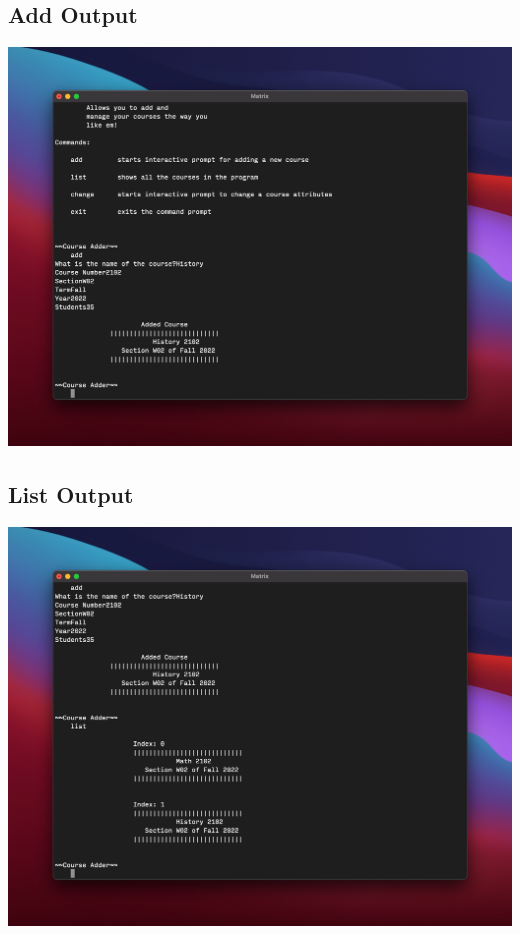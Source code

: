 \documentclass{report}
\begin{document}
\subsection*{Add Output}
\includegraphics[width = \textwidth]{add}
\subsection*{List Output}
\includegraphics[width = \textwidth]{list}
\end{document}
